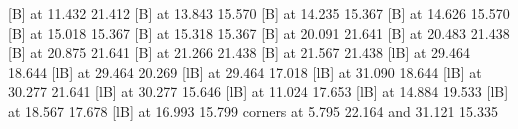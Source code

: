{%
%
 [B] at 11.432 21.412
%
%
 [B] at 13.843 15.570
%
%
 [B] at 14.235 15.367
%
%
 [B] at 14.626 15.570
%
%
 [B] at 15.018 15.367
%
%
 [B] at 15.318 15.367
%
%
 [B] at 20.091 21.641
%
%
 [B] at 20.483 21.438
%
%
 [B] at 20.875 21.641
%
%
 [B] at 21.266 21.438
%
%
 [B] at 21.567 21.438
%
%
 [lB] at 29.464 18.644
%
%
 [lB] at 29.464 20.269
%
%
 [lB] at 29.464 17.018
%
%
 [lB] at 31.090 18.644
%
%
 [lB] at 30.277 21.641
%
%
 [lB] at 30.277 15.646
%
%
 [lB] at 11.024 17.653
%
%
 [lB] at 14.884 19.533
%
%
 [lB] at 18.567 17.678
%
%
 [lB] at 16.993 15.799
\linethickness=0pt
\putrectangle corners at  5.795 22.164 and 31.121 15.335
\endpicture}
